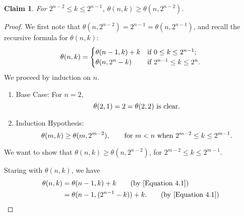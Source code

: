 \documentclass[12pt]{ucthesis}
\theoremstyle{plain}
\newtheorem{claim}{Claim}
\theoremstyle{definition}
\begin{document}
\begin{claim}
\label{Claim 3}
For $2^{n - 2} \le k \le 2^{n - 1}$, $\theta(n, k) \ge \theta(n, 2^{n - 2})$.
\end{claim}
\begin{proof}
We first note that $\theta(n, 2^{n - 2}) = 2^{n - 1} = \theta(n, 2^{n - 1})$,
and recall the recursive formula for $\theta(n, k)$:
\begin{equation}
\label{Equation 4.1}
\theta(n, k) = \begin{cases}
	\theta(n - 1, k) + k & \textnormal{if } 0 \le k \le 2^{n - 1}; \\
	\theta(n, 2^n - k) & \textnormal{if } 2^{n - 1} \le k \le 2^n.
\end{cases}
\end{equation}
We proceed by induction on $n$.
\begin{enumerate}[(1)]
\item Base Case: For $n = 2$,
	\begin{equation*}
	\theta(2, 1) = 2 = \theta(2, 2) \textnormal{ is clear}.
	\end{equation*}
\item Induction Hypothesis:
	\begin{equation}
	\label{Equation 4.2}
	\theta(m, k) \ge \theta(m, 2^{m - 2}), \qquad
	\textnormal{for } m < n \textnormal{ when } 2^{m - 2} \le k \le 2^{m - 1}.
	\end{equation}
\end{enumerate}

We want to show that $\theta(n, k) \ge \theta(n, 2^{n - 2})$,
for $2^{m - 2} \le k \le 2^{m - 1}$.

Staring with $\theta(n, k)$, we have
\begin{align*}
\theta(n, k)
& = \theta(n - 1, k) + k \tag{by \ref{Equation 4.1}} \\
& = \theta(n - 1, (2^{n - 1} - k)) + k. \tag{by \ref{Equation 4.1}}
\end{align*}


\end{proof}
\end{document}
